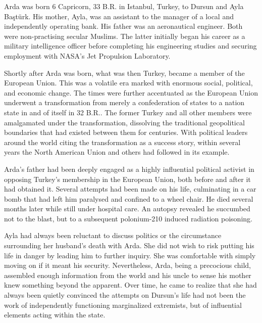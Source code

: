 
Arda was born 6 Capricorn, 33 B.R. in Istanbul, Turkey, to Dursun and Ayla Baştürk. His mother, Ayla, was an assistant to the manager of a local and independently operating bank. His father was an aeronautical engineer. Both were non-practising secular Muslims. The latter initially began his career as a military intelligence officer before completing his engineering studies and securing employment with NASA's Jet Propulsion Laboratory. 

Shortly after Arda was born, what was then Turkey, became a member of the European Union. This was a volatile era marked with enormous social, political, and economic change. The times were further accentuated as the European Union underwent a transformation from merely a confederation of states to a nation state in and of itself in 32 B.R.. The former Turkey and all other members were amalgamated under the transformation, dissolving the traditional geopolitical boundaries that had existed between them for centuries. With political leaders around the world citing the transformation as a success story, within several years the North American Union and others had followed in its example.

Arda's father had been deeply engaged as a highly influential political activist in opposing Turkey's membership in the European Union, both before and after it had obtained it. Several attempts had been made on his life, culminating in a car bomb that had left him paralysed and confined to a wheel chair. He died several months later while still under hospital care. An autopsy revealed he succumbed not to the blast, but to a subsequent polonium-210 induced radiation poisoning.

Ayla had always been reluctant to discuss politics or the circumstance surrounding her husband's death with Arda. She did not wish to risk putting his life in danger by leading him to further inquiry. She was comfortable with simply moving on if it meant his security. Nevertheless, Arda, being a precocious child, assembled enough information from the world and his uncle to sense his mother knew something beyond the apparent. Over time, he came to realize that she had always been quietly convinced the attempts on Dursun's life had not been the work of independently functioning marginalized extremists, but of influential elements acting within the state.

